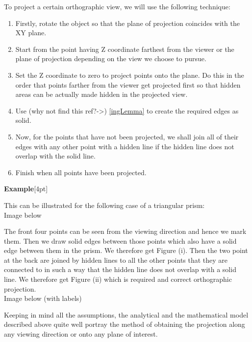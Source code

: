 \documentclass[12pt]{report}
\begin{document}
\vspace{0.2cm}
To project a certain orthographic view, we will use the following technique:
\\
\begin{enumerate}
  \item 
  Firstly, rotate the object so that the plane of projection coincides with the XY plane. 
  \item 
  Start from the point having Z coordinate farthest from the viewer or the plane of projection depending on the view we choose to pursue. 
  \item 
  Set the Z coordinate to zero to project points onto the plane. Do this in the order that points farther from the viewer get projected first so that hidden areas can be actually made hidden in the projected view. 
  \item 
  Use (why not find this ref?->) \ref{ingLemma} to create the required edges as solid. 
  \item 
  Now, for the points that have not been projected, we shall join all of their edges with any other point with a hidden line if the hidden line does not overlap with the solid line.
  \item 
  Finish when all points have been projected. 
  
\end{enumerate}


\textbf{Example}[4pt]

This can be illustrated for the following case of a triangular prism:\\
Image below\\
\vspace{6cm}

The front four points can be seen from the viewing direction and hence we mark them. Then we draw solid edges between those points which also have a solid edge between them in the prism. We therefore get	Figure (i). Then the two point at the back are joined by hidden lines to all the other points that they are connected to in such a way that the hidden line does not overlap with a solid line. We therefore get Figure (ii) which is required and correct orthographic projection.
\\
Image below (with labels) \\
\vspace{4cm}

Keeping in mind all the assumptions, the analytical and the mathematical model described above quite well portray the method of obtaining the projection along any viewing direction or onto any plane of interest.
\\
\vspace{0.3cm}
\end{document}
